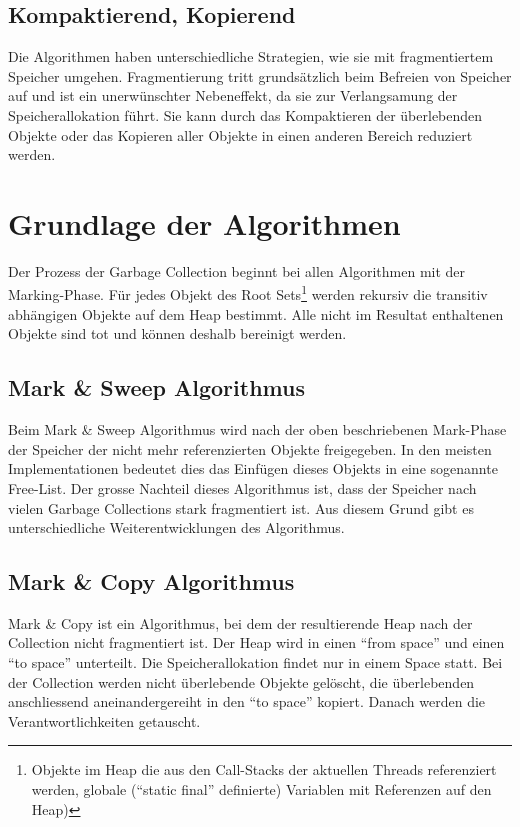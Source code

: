 \subsection{Kompaktierend, Kopierend}
Die Algorithmen haben unterschiedliche Strategien, wie sie mit fragmentiertem Speicher umgehen. Fragmentierung tritt grundsätzlich beim Befreien von Speicher auf und ist ein unerwünschter Nebeneffekt, da sie zur Verlangsamung der Speicherallokation führt. Sie kann durch das Kompaktieren der überlebenden Objekte oder das Kopieren aller Objekte in einen anderen Bereich reduziert werden.

\section{Grundlage der Algorithmen}
Der Prozess der Garbage Collection beginnt bei allen Algorithmen mit der Marking-Phase. Für jedes Objekt des Root Sets\footnote{Objekte im Heap die aus den Call-Stacks der aktuellen Threads referenziert werden, globale (``static final'' definierte) Variablen mit Referenzen auf den Heap)} werden rekursiv die transitiv abhängigen Objekte auf dem Heap bestimmt. Alle nicht im Resultat enthaltenen Objekte sind tot und können deshalb bereinigt werden.

\subsection{Mark \& Sweep Algorithmus}
Beim Mark \& Sweep Algorithmus wird nach der oben beschriebenen Mark-Phase der Speicher der nicht mehr referenzierten Objekte freigegeben. In den meisten Implementationen bedeutet dies das Einfügen dieses Objekts in eine sogenannte Free-List. Der grosse Nachteil dieses Algorithmus ist, dass der Speicher nach vielen Garbage Collections stark fragmentiert ist. Aus diesem Grund gibt es unterschiedliche Weiterentwicklungen des Algorithmus.

\subsection{Mark \& Copy Algorithmus}
Mark \& Copy ist ein Algorithmus, bei dem der resultierende Heap nach der Collection nicht fragmentiert ist. Der Heap wird in einen ``from space'' und einen ``to space'' unterteilt. Die Speicherallokation findet nur in einem Space statt. Bei der Collection werden nicht überlebende Objekte gelöscht, die überlebenden anschliessend aneinandergereiht in den ``to space'' kopiert. Danach werden die Verantwortlichkeiten getauscht.

